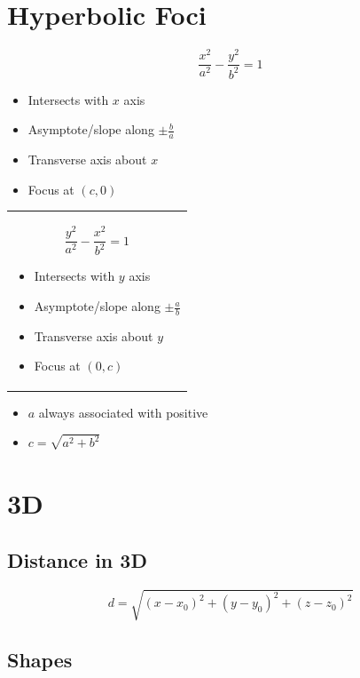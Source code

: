 \documentclass[12pt]{article}
\begin{document}
\section{Hyperbolic Foci}
\begin{minipage}{0.5\textwidth}
$$\frac{x^2}{a^2} - \frac{y^2}{b^2} = 1$$
\begin{itemize}
    \item Intersects with $x$ axis
    \item Asymptote/slope along $\pm \frac{b}{a}$
    \item Transverse axis about $x$
    \item Focus at $(c,0)$
\end{itemize}

\end{minipage}
\begin{minipage}{0.45\textwidth}
\begin{tabular}{|p{\textwidth}}

$$\frac{y^2}{a^2} - \frac{x^2}{b^2} = 1$$
\begin{itemize}
    \item Intersects with $y$ axis
    \item Asymptote/slope along $\pm \frac{a}{b}$
    \item Transverse axis about $y$
    \item Focus at $(0,c)$
\end{itemize}
\end{tabular}
\end{minipage}

\begin{itemize}
    \item $a$ always associated with positive 
    \item $c=\sqrt{a^2+b^2}$
\end{itemize}

\section{3D}
\subsection{Distance in 3D}
$$d=\sqrt{(x-x_0)^2 + (y-y_0)^2 + (z-z_0)^2}$$

\subsection{Shapes}
\end{document}
